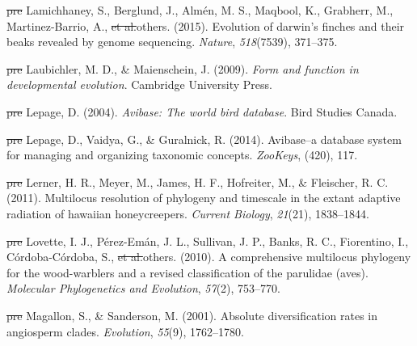 \documentclass[english,man]{apa6} %
\providecommand{\DIFaddtex}[1]{{\protect\color{blue}\uwave{#1}}} %
\providecommand{\DIFdeltex}[1]{{\protect\color{red}\sout{#1}}}                      %
\providecommand{\DIFaddbegin}{} %
\providecommand{\DIFaddend}{} %
\providecommand{\DIFdelbegin}{} %
\providecommand{\DIFdelend}{} %
\providecommand{\DIFadd}[1]{\texorpdfstring{\DIFaddtex{#1}}{#1}} %
\providecommand{\DIFdel}[1]{\texorpdfstring{\DIFdeltex{#1}}{}} %
\newcommand{\DIFscaledelfig}{0.5}
\newlength{\DIFdelgraphicswidth} %
\newlength{\DIFdelgraphicsheight} %
\newcommand{\DIFaddincludegraphics}[2][]{{\color{blue}\fbox{\DIFOincludegraphics[#1]{#2}}}} %
\newcommand{\DIFdelincludegraphics}[2][]{%
\sbox{\DIFdelgraphicsbox}{\DIFOincludegraphics[#1]{#2}}%
\settoboxwidth{\DIFdelgraphicswidth}{\DIFdelgraphicsbox} %
\settoboxtotalheight{\DIFdelgraphicsheight}{\DIFdelgraphicsbox} %
\scalebox{\DIFscaledelfig}{%
\parbox[b]{\DIFdelgraphicswidth}{\usebox{\DIFdelgraphicsbox}\\[-\baselineskip] \rule{\DIFdelgraphicswidth}{0em}}\llap{\resizebox{\DIFdelgraphicswidth}{\DIFdelgraphicsheight}{%
\setlength{\unitlength}{\DIFdelgraphicswidth}%
\begin{picture}(1,1)%
\thicklines\linethickness{2pt} %
{\color[rgb]{1,0,0}\put(0,0){\framebox(1,1){}}}%
{\color[rgb]{1,0,0}\put(0,0){\line( 1,1){1}}}%
{\color[rgb]{1,0,0}\put(0,1){\line(1,-1){1}}}%
\end{picture}%
}\hspace*{3pt}}} %
} %
\DeclareRobustCommand{\DIFaddbegin}{\DIFOaddbegin \let\includegraphics\DIFaddincludegraphics} %
\DeclareRobustCommand{\DIFaddend}{\DIFOaddend \let\includegraphics\DIFOincludegraphics} %
\DeclareRobustCommand{\DIFdelbegin}{\DIFOdelbegin \let\includegraphics\DIFdelincludegraphics} %
\DeclareRobustCommand{\DIFdelend}{\DIFOaddend \let\includegraphics\DIFOincludegraphics} %
\begin{document}
\leavevmode\DIFdelbegin %
\DIFdel{pre}%
\DIFdelend \hypertarget{ref-lamichhaney2015evolution}{}\DIFdelbegin %
\DIFdelend %
Lamichhaney, S., Berglund, J., Almén, M. S., Maqbool, K., Grabherr, M., Martinez-Barrio, A., \DIFdelbegin \DIFdel{et al.}\DIFdelend \DIFaddbegin \DIFadd{\ldots{} }\DIFaddend others. (2015). Evolution of darwin's finches and their beaks revealed by genome sequencing. \emph{Nature}, \emph{518}(7539), 371--375.

\leavevmode\DIFdelbegin %
\DIFdel{pre}%
\DIFdelend \hypertarget{ref-laubichler2009form}{}\DIFdelbegin %
\DIFdelend %
Laubichler, M. D., \& Maienschein, J. (2009). \emph{Form and function in developmental evolution}. Cambridge University Press.

\leavevmode\DIFdelbegin %
\DIFdel{pre}%
\DIFdelend \hypertarget{ref-lepage2004avibase}{}\DIFdelbegin %
\DIFdelend %
Lepage, D. (2004). \emph{Avibase: The world bird database}. Bird Studies Canada.

\leavevmode\DIFdelbegin %
\DIFdel{pre}%
\DIFdelend \hypertarget{ref-lepage2014avibase}{}\DIFdelbegin %
\DIFdelend %
Lepage, D., Vaidya, G., \& Guralnick, R. (2014). Avibase--a database system for managing and organizing taxonomic concepts. \emph{ZooKeys}, (420), 117.

\leavevmode\DIFdelbegin %
\DIFdel{pre}%
\DIFdelend \hypertarget{ref-lerner2011multilocus}{}\DIFdelbegin %
\DIFdelend %
Lerner, H. R., Meyer, M., James, H. F., Hofreiter, M., \& Fleischer, R. C. (2011). Multilocus resolution of phylogeny and timescale in the extant adaptive radiation of hawaiian honeycreepers. \emph{Current Biology}, \emph{21}(21), 1838--1844.

\leavevmode\DIFdelbegin %
\DIFdel{pre}%
\DIFdelend \hypertarget{ref-lovette2010comprehensive}{}\DIFdelbegin %
\DIFdelend %
Lovette, I. J., Pérez-Emán, J. L., Sullivan, J. P., Banks, R. C., Fiorentino, I., Córdoba-Córdoba, S., \DIFdelbegin \DIFdel{et al.}\DIFdelend \DIFaddbegin \DIFadd{\ldots{} }\DIFaddend others. (2010). A comprehensive multilocus phylogeny for the wood-warblers and a revised classification of the parulidae (aves). \emph{Molecular Phylogenetics and Evolution}, \emph{57}(2), 753--770.

\leavevmode\DIFdelbegin %
\DIFdel{pre}%
\DIFdelend \hypertarget{ref-magallon2001absolute}{}\DIFdelbegin %
\DIFdelend %
Magallon, S., \& Sanderson, M. (2001). Absolute diversification rates in angiosperm clades. \emph{Evolution}, \emph{55}(9), 1762--1780.
\end{document}
